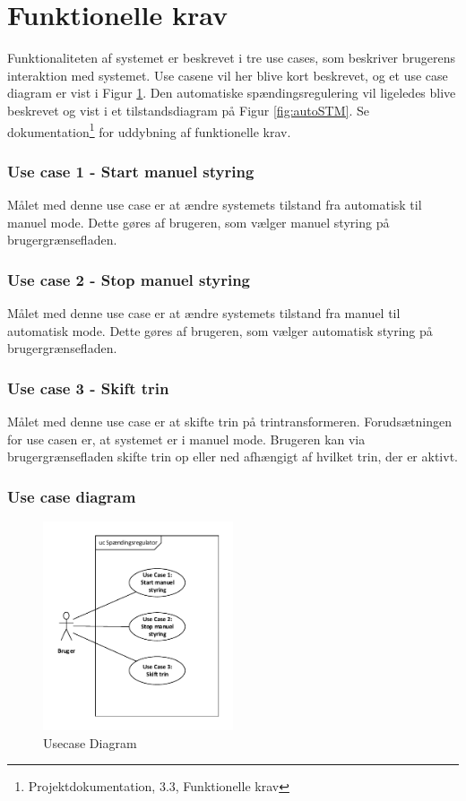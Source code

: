 
\section{Funktionelle krav}

Funktionaliteten af systemet er beskrevet i tre use cases, som beskriver brugerens interaktion med systemet. Use casene vil her blive kort beskrevet, og et use case diagram er vist i Figur \ref{fig:UsecaseDiagram}.
 Den automatiske spændingsregulering vil ligeledes blive beskrevet og vist i et tilstandsdiagram på Figur \ref{fig:autoSTM}.
  Se dokumentation\footnote{Projektdokumentation, 3.3, Funktionelle krav} for uddybning af funktionelle krav. 

\subsubsection{Use case 1 - Start manuel styring}
Målet med denne use case er at ændre systemets tilstand fra automatisk til manuel mode. Dette gøres af brugeren, som vælger manuel styring på brugergrænsefladen. 

\subsubsection{Use case 2 - Stop manuel styring}
Målet med denne use case er at ændre systemets tilstand fra manuel til automatisk mode. Dette gøres af brugeren, som vælger automatisk styring på brugergrænsefladen. 

\subsubsection{Use case 3 - Skift trin}
Målet med denne use case er at skifte trin på trintransformeren. Forudsætningen for use casen er, at systemet er i manuel mode. Brugeren kan via brugergrænsefladen skifte trin op eller ned afhængigt af hvilket trin, der er aktivt. 

\subsubsection{Use case diagram}
\begin{figure}[H] %
	\centering
	\includegraphics[width=0.5\textwidth]{figure/UsecaseDiagram}
	\caption{Usecase Diagram}
	\label{fig:UsecaseDiagram}
\end{figure}

